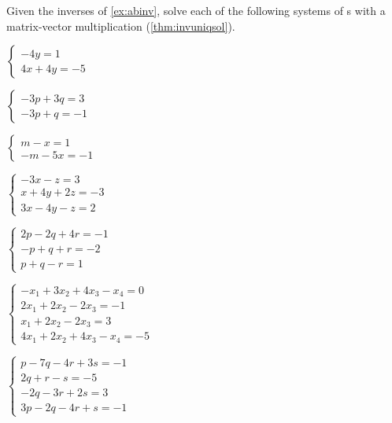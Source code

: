\begin{exercise}  
Given the inverses of \cref{ex:abinv}, solve each of the following systems of s with a matrix-vector multiplication (\cref{thm:invuniqsol}).
\begin{Parts}
\item \(\begin{cases} -4y=1\\4x+4y=-5 \end{cases}\)

\begin{reduce}
\item \(\begin{cases} -3p+3q=3\\-3p+q=-1 \end{cases}\)
\end{reduce}

\item \(\begin{cases} m-x=1\\-m-5x=-1 \end{cases}\)

\begin{reduce}
\item \(\begin{cases} -3x-z=3\\ x+4y+2z=-3\\ 3x-4y-z=2 \end{cases}\)
\end{reduce}

\item \(\begin{cases} 2p-2q+4r=-1\\ -p+q+r=-2\\ p+q-r=1 \end{cases}\)

\item \(\begin{cases} -x_1+3x_2+4x_3-x_4=0
\\2x_1+2x_2-2x_3=-1
\\x_1+2x_2-2x_3=3
\\4x_1+2x_2+4x_3-x_4=-5 \end{cases}\)

\item \(\begin{cases} p-7q-4r+3s=-1
\\2q+r-s=-5
\\-2q-3r+2s=3
\\3p-2q-4r+s=-1 \end{cases}\)


\end{Parts}
\end{exercise}
